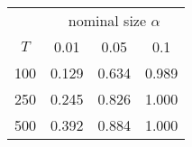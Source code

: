 % 
\begin{tabular}{cccc}
  \hline
  & \multicolumn{3}{c}{nominal size $\alpha$} \\
 $T$ & 0.01 & 0.05 & 0.1 \\
 \hline
100 & 0.129 & 0.634 & 0.989 \\ 
  250 & 0.245 & 0.826 & 1.000 \\ 
  500 & 0.392 & 0.884 & 1.000 \\ 
   \hline
\end{tabular}
